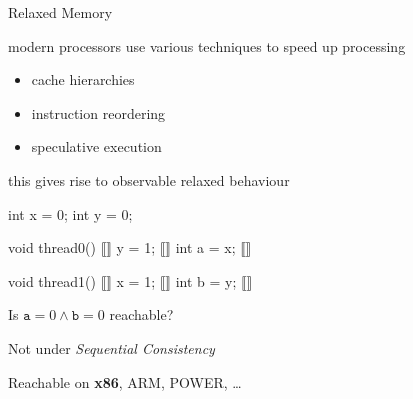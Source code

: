 \documentclass[aspectratio=169, fi]{paradise-slide}
\begin{document}
\begin{frame}[fragile]{Relaxed Memory}
  \begin{minipage}{0.47\textwidth}
    modern processors use various techniques to speed up processing
    \begin{itemize}
      \item cache hierarchies
      \item instruction reordering
      \item speculative execution
    \end{itemize}
    \pause

    this gives rise to observable relaxed behaviour
  \end{minipage}
  \hfill\pause
  \begin{minipage}{0.48\textwidth}
    \begin{cppcode}
      int x = 0;
      int y = 0;
    \end{cppcode}
    \begin{minipage}{0.49\textwidth}
      \begin{cppcode}
        void thread0()
        { ⟦⟧
          y = 1; ⟦⟧
          int a = x; ⟦⟧
        }
      \end{cppcode}
    \end{minipage}
    \hfill
    \begin{minipage}{0.49\textwidth}
      \begin{cppcode}
        void thread1()
        { ⟦⟧
          x = 1; ⟦⟧
          int b = y; ⟦⟧
        }
      \end{cppcode}
    \end{minipage}

    \centering\medskip
    Is $\texttt{a} = 0 \land \texttt{b} = 0$ reachable?
  \end{minipage}

  \bigskip\bigskip\pause
  \begin{minipage}[t]{0.48\textwidth}
    Not under \emph{Sequential Consistency}

  \end{minipage}
  \hfill\pause
  \begin{minipage}[t]{0.48\textwidth}
    Reachable on \textbf{x86}, ARM, POWER, …

  \end{minipage}
\end{frame}
\end{document}

